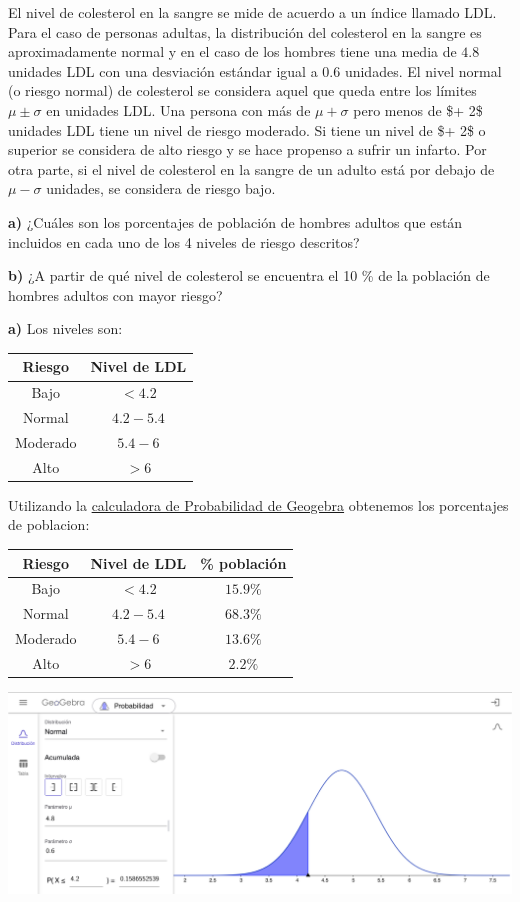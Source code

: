 \documentclass[
]{book}
\begin{document}
El nivel de colesterol en la sangre se mide de acuerdo a un índice llamado LDL. Para el caso de personas adultas, la distribución del colesterol en la sangre es aproximadamente normal y en el caso de los hombres tiene una media de \(4.8\) unidades LDL con una desviación estándar igual a \(0.6\) unidades. El nivel normal (o riesgo normal) de colesterol se considera aquel que queda entre los límites \(\mu \pm \sigma\) en unidades LDL. Una persona con más de \(\mu + \sigma\) pero menos de \$\mu + 2\sigma \$ unidades LDL tiene un nivel de riesgo moderado. Si tiene un nivel de \$\mu + 2\sigma \$ o superior se considera de alto riesgo y se hace propenso a sufrir un infarto. Por otra parte, si el nivel de colesterol en la sangre de un adulto está por debajo de \(\mu - \sigma\) unidades, se considera de riesgo bajo.

\textbf{a)} ¿Cuáles son los porcentajes de población de hombres adultos que están incluidos en cada uno de los 4 niveles de riesgo descritos?

\textbf{b)} ¿A partir de qué nivel de colesterol se encuentra el 10 \% de la población de hombres adultos con mayor riesgo?

\textbf{a)} Los niveles son:

\begin{longtable}[]{@{}cc@{}}
\toprule
Riesgo & Nivel de LDL\tabularnewline
\midrule
\endhead
Bajo & \(< 4.2\)\tabularnewline
Normal & \(4.2 -5.4\)\tabularnewline
Moderado & \(5.4 -6\)\tabularnewline
Alto & \(> 6\)\tabularnewline
\bottomrule
\end{longtable}

Utilizando la \href{https://www.geogebra.org/calculator}{calculadora de Probabilidad de Geogebra} obtenemos los porcentajes de poblacion:

\begin{longtable}[]{@{}ccc@{}}
\toprule
Riesgo & Nivel de LDL & \% población\tabularnewline
\midrule
\endhead
Bajo & \(< 4.2\) & \(15.9 \%\)\tabularnewline
Normal & \(4.2 - 5.4\) & \(68.3 \%\)\tabularnewline
Moderado & \(5.4 - 6\) & \(13.6 \%\)\tabularnewline
Alto & \(> 6\) & \(2.2 \%\)\tabularnewline
\bottomrule
\end{longtable}

\includegraphics[width=28.44in]{img/3_9}
\end{document}
